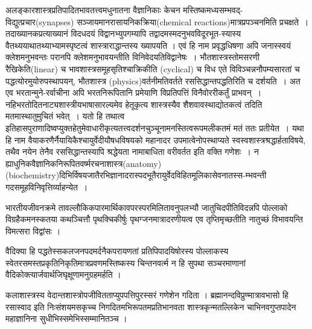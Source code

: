 {\dev अलङ्कारशास्त्रप्रतिपादितभावतत्त्वमधुनातना वैज्ञानिकाः केचन मस्तिष्कमध्यसम्भवद्-विद्युत्\-प्रचार}(synapses) {\dev सञ्जायमानरासायनिकक्रिया}(chemical reactions){\dev मात्रप्रपञ्चनमिति प्रचक्षते~। तदाख्यानकप्रत्याख्यानं विदधदयं विद्वानभ्युपगम्यापि तद्वादमस्मदनुभवविदूरभूत-\break\-स्यास्य वैतथ्ययाथातथ्याभ्यामस्पृष्टत्वं शास्त्राराद्धा\-न्तस्य ख्यापयति । एवं हि नाम प्रवृद्ध\-धिषणा अपि जनास्स्वयं क्लेशमनुभवन्तः परानपि क्लेशमनुभावयन्तीति विनिवेदयति\break विद्वानेषः~। भौत\-शास्त्रस्तोमसरणी रैखिकेति}(linear) {\dev च भावशास्त्र\-समूहसृतिश्चाक्रिकीति} (cyclical) {\dev च विध एते विविञ्चन्ननौपम्यसारतां च पद्धत्योरमुयोरुपस्थापयन्, भौतशास्त्र} (physics){\dev वर्त\-नीमति\-वर्तते रससिद्धान्तपद्धतिरिति च दर्शयति~। अत एव भरतान्मुने{-}\break रर्वाचीना अपि भरत\-निरूपितानि प्रमेयाणि विप्रतिपत्तिं विनैवोररीकर्तुं प्राभवन्~। नहि\break भरतोदितनाट्य\-शास्त्रीय\-भाषासारल्यमेव हेतूकृत्य शास्त्रस्यैव शैशवावस्थाद्योतकत्वं तदिति मतमास्थातुमुचितं भवेत्~। यतो हि तथात्व इतिहासपुराणादिष्वप्युक्तहेतुमेवाधारीकृत्य\break   तत्त्वदर्शनचुञ्चूनामनस्ति\-त्वरूपमलीकतमं मतं ततः प्रती\-येत~। यथा हि नाम वैयाकरणैर्नैयायि\-कैश्चायुर्वेदीयौषधविषयको महानादर उपमात्वे\-नोपस्थाप्यते स्वस्वशास्त्रश्रद्धार्हताविषये, तथैव नयेन तेनैव रससिद्धान्तस्यापि श्रद्धेयता नामा\-बाधिता वरीवर्तत इति वक्ति गणेशः~। न ह्याधुनिकवैज्ञानिकनिरूपितवर्ष्मरचनाशास्त्र}(anatomy)\break (bio\-chem\-istry){\dev दिभिर्विषयजातैरभिज्ञानादरास्पदभूतैरायु\-र्वेद\-विहित\-मूलिका\-सेवनातस्स{-}\break म्भवन्ती गदसमूहविनिवृत्तिर्व्याहन्येत~।}

{\dev भारतीयजीवनक्रमे तावल्लौकिकपारमार्थिकावपरस्परमिलितावनुपलभ्यौ जातुचिदपीति\break विदन्नपि पोल्लाको विग्रहैकमनस्कतया कथञ्चित्तौ पृथक्चिकीर्षुः पृथग्जनमात्रादरणीयत्व एव तृप्तिमृच्छतीति नातुच्छं विभावयन्ति विमत्सरा विद्वांसः ।}

{\dev वैदिक्या हि पद्धतेस्सकलजनपदमर्दनैकपरायणतां प्रतिपिपादयिषोरस्य पोल्लाकस्य स्वेतर\-समस्तप्रकृतिनिकृतिमात्रप्रवणमस्तिष्कस्य चिन्तनवर्त्म न हि सुपथा सञ्चरमाणानां वैदिको\-क्त्यार्जवार्थजिघृक्षूणामनुग्रहमर्हति ।}
\vskip 1pt

{\dev कलाशास्त्रस्य वेदान्तशास्त्रोपजीवितताप्युपपत्तिपुरस्सरं गणेशेन गदिता । ब्रह्मानन्दविप्रुण्\-मात्रावभासो हि रसास्वाद इति निःसंशयमसकृच्च निगदितमभिरूपतमप्रतिभानवता शास्त्रकृन्मत\-ल्लिकेन चाभिनवगुप्तपादेन महाज्ञानिना सुधीभिस्समेभिस्सम्मानितञ्च ।}
\vskip 1pt

